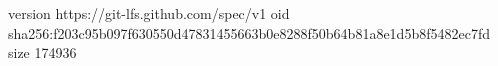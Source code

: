 version https://git-lfs.github.com/spec/v1
oid sha256:f203c95b097f630550d47831455663b0e8288f50b64b81a8e1d5b8f5482ec7fd
size 174936
